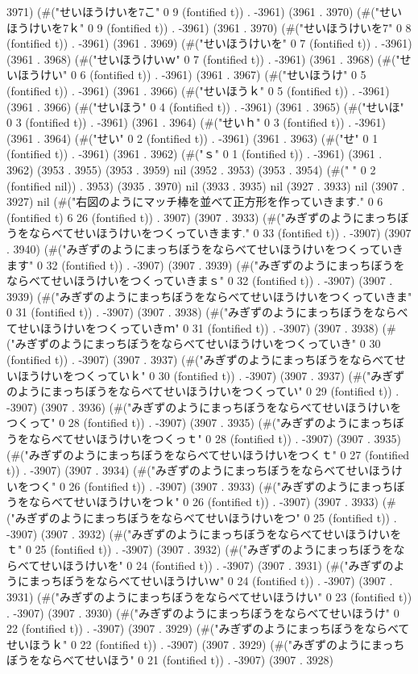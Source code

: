 3971) (#("せいほうけいを7こ" 0 9 (fontified t)) . -3961) (3961 . 3970) (#("せいほうけいを7ｋ" 0 9 (fontified t)) . -3961) (3961 . 3970) (#("せいほうけいを7" 0 8 (fontified t)) . -3961) (3961 . 3969) (#("せいほうけいを" 0 7 (fontified t)) . -3961) (3961 . 3968) (#("せいほうけいｗ" 0 7 (fontified t)) . -3961) (3961 . 3968) (#("せいほうけい" 0 6 (fontified t)) . -3961) (3961 . 3967) (#("せいほうけ" 0 5 (fontified t)) . -3961) (3961 . 3966) (#("せいほうｋ" 0 5 (fontified t)) . -3961) (3961 . 3966) (#("せいほう" 0 4 (fontified t)) . -3961) (3961 . 3965) (#("せいほ" 0 3 (fontified t)) . -3961) (3961 . 3964) (#("せいｈ" 0 3 (fontified t)) . -3961) (3961 . 3964) (#("せい" 0 2 (fontified t)) . -3961) (3961 . 3963) (#("せ" 0 1 (fontified t)) . -3961) (3961 . 3962) (#("ｓ" 0 1 (fontified t)) . -3961) (3961 . 3962) (3953 . 3955) (3953 . 3959) nil (3952 . 3953) (3953 . 3954) (#("  " 0 2 (fontified nil)) . 3953) (3935 . 3970) nil (3933 . 3935) nil (3927 . 3933) nil (3907 . 3927) nil (#("右図のようにマッチ棒を並べて正方形を作っていきます." 0 6 (fontified t) 6 26 (fontified t)) . 3907) (3907 . 3933) (#("みぎずのようにまっちぼうをならべてせいほうけいをつくっていきます." 0 33 (fontified t)) . -3907) (3907 . 3940) (#("みぎずのようにまっちぼうをならべてせいほうけいをつくっていきます" 0 32 (fontified t)) . -3907) (3907 . 3939) (#("みぎずのようにまっちぼうをならべてせいほうけいをつくっていきまｓ" 0 32 (fontified t)) . -3907) (3907 . 3939) (#("みぎずのようにまっちぼうをならべてせいほうけいをつくっていきま" 0 31 (fontified t)) . -3907) (3907 . 3938) (#("みぎずのようにまっちぼうをならべてせいほうけいをつくっていきｍ" 0 31 (fontified t)) . -3907) (3907 . 3938) (#("みぎずのようにまっちぼうをならべてせいほうけいをつくっていき" 0 30 (fontified t)) . -3907) (3907 . 3937) (#("みぎずのようにまっちぼうをならべてせいほうけいをつくっていｋ" 0 30 (fontified t)) . -3907) (3907 . 3937) (#("みぎずのようにまっちぼうをならべてせいほうけいをつくってい" 0 29 (fontified t)) . -3907) (3907 . 3936) (#("みぎずのようにまっちぼうをならべてせいほうけいをつくって" 0 28 (fontified t)) . -3907) (3907 . 3935) (#("みぎずのようにまっちぼうをならべてせいほうけいをつくっｔ" 0 28 (fontified t)) . -3907) (3907 . 3935) (#("みぎずのようにまっちぼうをならべてせいほうけいをつくｔ" 0 27 (fontified t)) . -3907) (3907 . 3934) (#("みぎずのようにまっちぼうをならべてせいほうけいをつく" 0 26 (fontified t)) . -3907) (3907 . 3933) (#("みぎずのようにまっちぼうをならべてせいほうけいをつｋ" 0 26 (fontified t)) . -3907) (3907 . 3933) (#("みぎずのようにまっちぼうをならべてせいほうけいをつ" 0 25 (fontified t)) . -3907) (3907 . 3932) (#("みぎずのようにまっちぼうをならべてせいほうけいをｔ" 0 25 (fontified t)) . -3907) (3907 . 3932) (#("みぎずのようにまっちぼうをならべてせいほうけいを" 0 24 (fontified t)) . -3907) (3907 . 3931) (#("みぎずのようにまっちぼうをならべてせいほうけいｗ" 0 24 (fontified t)) . -3907) (3907 . 3931) (#("みぎずのようにまっちぼうをならべてせいほうけい" 0 23 (fontified t)) . -3907) (3907 . 3930) (#("みぎずのようにまっちぼうをならべてせいほうけ" 0 22 (fontified t)) . -3907) (3907 . 3929) (#("みぎずのようにまっちぼうをならべてせいほうｋ" 0 22 (fontified t)) . -3907) (3907 . 3929) (#("みぎずのようにまっちぼうをならべてせいほう" 0 21 (fontified t)) . -3907) (3907 . 3928) 